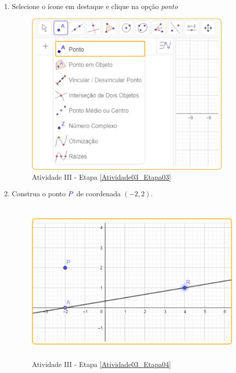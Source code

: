 \documentclass[11pt,a4paper]{article}
\begin{document}
\begin{enumerate}[{Etapa} 1.]
\item Selecione o ícone em destaque e clique na opção {\it ponto} \label{Atividade03_Etapa03}
\begin{figure}[H]
    \centering
    \includegraphics[height=8cm]{Figuras/T01_Elemento01.png}
    \caption{Atividade III - Etapa \ref{Atividade03_Etapa03}}
    \label{Atividade03_Etapa03_Imagem}
\end{figure}

\item Construa o ponto ${\color{blue}{P}}$ de coordenada $(-2,2)$. \label{Atividade03_Etapa04}
\begin{figure}[H]
    \centering
    \includegraphics[height=8cm]{Figuras/T01_Atividade02_Fig02.png}
    \caption{Atividade III - Etapa \ref{Atividade03_Etapa04}}
    \label{Atividade03_Etapa04_Imagem}
\end{figure}


\end{enumerate}
\end{document}

